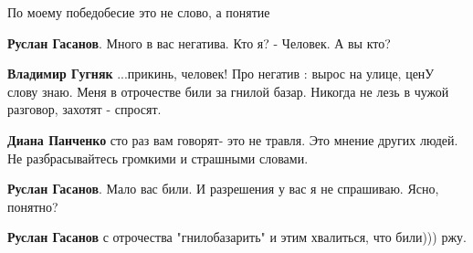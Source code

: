 \begin{itemize}
\begin{itemize}
По моему победобесие это не слово, а понятие

 
\textbf{Руслан Гасанов}. Много в вас негатива. Кто я? - Человек. А вы кто?

 
\textbf{Владимир Гугняк} ...прикинь, человек! Про негатив : вырос на улице,
ценУ слову знаю. Меня в отрочестве били за гнилой базар. Никогда не лезь в
чужой разговор, захотят - спросят.

 
\textbf{Диана Панченко} сто раз вам говорят- это не травля. Это мнение других людей. Не разбрасывайтесь громкими и страшными словами.

 
\textbf{Руслан Гасанов}. Мало вас били. И разрешения у вас я не спрашиваю. Ясно, понятно?

 

\textbf{Руслан Гасанов} с отрочества "гнилобазарить" и этим хвалиться, что били))) ржу.

 

\end{itemize}
\end{itemize}

